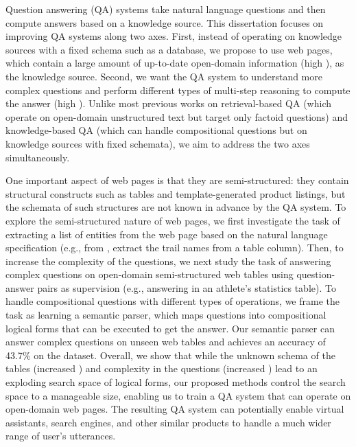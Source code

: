 Question answering (QA) systems
take natural language questions
and then compute answers based on a knowledge source.
This dissertation focuses on improving
QA systems along two axes.
First, instead of operating on knowledge sources with a fixed schema
such as a database,
we propose to use web pages,
which contain a large amount of up-to-date open-domain information
(high \Breadth),
as the knowledge source.
Second, we want the QA system to understand more
complex questions and perform different types of multi-step reasoning
to compute the answer
(high \Depth).
Unlike most previous works on retrieval-based QA
(which operate on open-domain unstructured text
but target only factoid questions)
and knowledge-based QA
(which can handle compositional questions
but on knowledge sources with fixed schemata),
we aim to address the two axes simultaneously.

One important aspect of web pages is that they are semi-structured:
they contain structural constructs
such as tables and template-generated product listings,
but the schemata of such structures are not known in advance
by the QA system.
To explore the semi-structured nature of web pages,
we first investigate the task of extracting a list of entities
from the web page
based on the natural language specification
(e.g., from ,
extract the trail names from a table column).
Then, to increase the complexity of the questions,
we next study the task of answering complex questions
on open-domain semi-structured web tables
using question-answer pairs as supervision
(e.g., answering 
in an athlete's statistics table).
To handle compositional questions with
different types of operations,
we frame the task as learning a semantic parser,
which maps questions into
compositional logical forms that can be
executed to get the answer.
Our semantic parser can answer complex questions
on unseen web tables
and achieves an accuracy of
43.7\% on the dataset.
Overall, we show that
while the unknown schema of the tables
(increased \Breadth)
and complexity in the questions (increased \Depth)
lead to an exploding search space of logical forms,
our proposed methods control the
search space to a manageable size,
enabling us to train a QA system
that can operate on open-domain web pages.
The resulting QA system can potentially enable virtual assistants,
search engines, and other similar products
to handle a much wider range of user's utterances.
